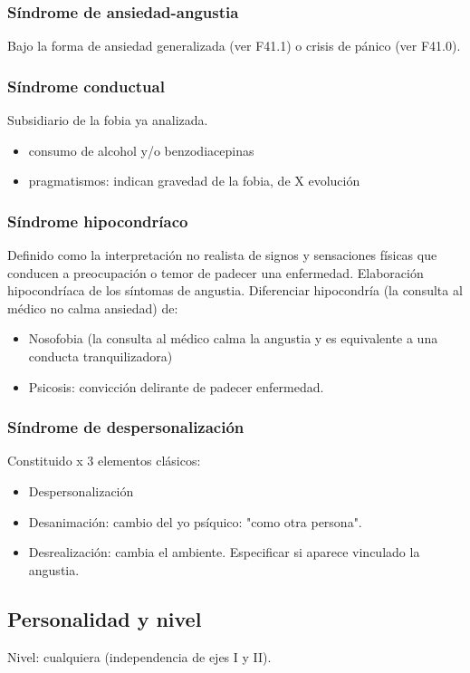 \documentclass{scrbook}
\begin{document}
\subsubsection*{Síndrome de ansiedad-angustia}
Bajo la forma de ansiedad generalizada (ver F41.1) o crisis de pánico (ver F41.0).
\subsubsection*{Síndrome conductual}
Subsidiario de la fobia ya analizada.
\begin{itemize}
	\item consumo de alcohol y/o benzodiacepinas
	\item pragmatismos: indican gravedad de la fobia, de X evolución
\end{itemize}
\subsubsection*{Síndrome hipocondríaco}
Definido como la interpretación no realista de signos y sensaciones físicas que conducen a preocupación o temor de padecer una enfermedad. Elaboración hipocondríaca de los síntomas de angustia. Diferenciar hipocondría (la consulta al médico no calma ansiedad) de:
\begin{itemize}
	\item Nosofobia (la consulta al médico calma la angustia y es equivalente a una conducta tranquilizadora)
	\item Psicosis: convicción delirante de padecer enfermedad.
\end{itemize}
\subsubsection*{Síndrome de despersonalización}
Constituido x 3 elementos clásicos:
\begin{itemize}
	\item Despersonalización
	\item Desanimación: cambio del yo psíquico: "como otra persona".
	\item Desrealización: cambia el ambiente. Especificar si aparece vinculado la angustia.
\end{itemize}
\subsection*{Personalidad y nivel}
Nivel: cualquiera (independencia de ejes I y II).
\end{document}
